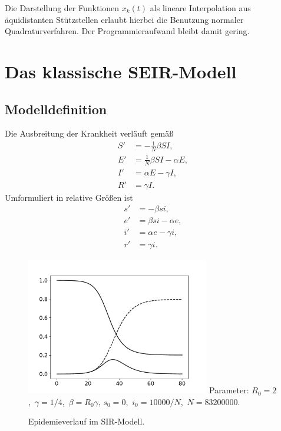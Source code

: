 \documentclass[a4paper,10pt,fleqn,twocolumn,twoside,dvipdfmx]{scrartcl}
\numberwithin{equation}{section}
\begin{document}
Die Darstellung der Funktionen $x_k(t)$ als lineare Interpolation
aus äquidistanten Stützstellen erlaubt hierbei die Benutzung
normaler Quadraturverfahren. Der Programmieraufwand bleibt damit gering.


\section{Das klassische SEIR-Modell}

\subsection{Modelldefinition}
Die Ausbreitung der Krankheit verläuft gemäß%
\begin{align}
S' &= -\tfrac{1}{N} \beta SI,\\
E' &= \tfrac{1}{N} \beta SI - \alpha E,\\
I' &= \alpha E - \gamma I,\\
R' &= \gamma I.
\end{align}
Umformuliert in relative Größen ist
\begin{align}
s' &= - \beta si,\\
e' &= \beta si - \alpha e,\\
i' &= \alpha e - \gamma i,\\
r' &= \gamma i.
\end{align}

\begin{figure}
\begin{center}
\includegraphics[width=80mm]{img/01-sir.pdf}
Parameter: $R_0 = 2$,\, $\gamma = 1/4$,\, $\beta = R_0\gamma$,\newline
$s_0 = 0$,\, $i_0 = 10000/N$,\, $N = 83200000$.
\end{center}
\caption{Epidemieverlauf im SIR-Modell.}
\end{figure}

\newpage
\end{document}
